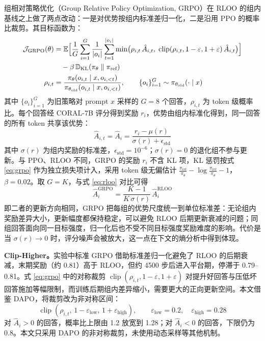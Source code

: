 \documentclass[fontset=fandol,type=master,campus=shenzhen,etitleauto=true]{hithesisbook}
\begin{document}
组相对策略优化（Group Relative Policy Optimization, GRPO）\cite{ref34}在 RLOO 的组内基线之上做了两点改动：一是对优势按组内标准差归一化，二是沿用 PPO 的概率比裁剪。其目标函数为：
\begin{equation}\label{eq:grpo}
\begin{aligned}
\mathcal{J}_{\text{GRPO}}(\theta) &= \mathbb{E} \Bigl[ \frac{1}{G}\sum_{i=1}^{G} \frac{1}{|o_i|}\sum_{t=1}^{|o_i|} \min\bigl( \rho_{i,t}\, \hat{A}_{i,t},\; \operatorname{clip}(\rho_{i,t}, 1-\varepsilon, 1+\varepsilon)\, \hat{A}_{i,t} \bigr) \Bigr] \\
&\quad - \beta\, \mathbb{D}_{\text{KL}}(\pi_\theta \parallel \pi_{\text{ref}}) \\
\rho_{i,t} &= \frac{\pi_\theta(o_{i,t} \mid x, o_{i,<t})}{\pi_{\theta_{\text{old}}}(o_{i,t} \mid x, o_{i,<t})}, \qquad \{o_i\}_{i=1}^{G} \sim \pi_{\theta_{\text{old}}}(\cdot \mid x)
\end{aligned}
\end{equation}
其中 $\{o_i\}_{i=1}^{G}$ 为旧策略对 prompt $x$ 采样的 $G = 8$ 个回答，$\rho_{i,t}$ 为 token 级概率比。每个回答经 CORAL-7B 评分得到奖励 $r_i$，优势由组内标准化得到，同一回答的所有 token 共享该优势：
\begin{equation}
\hat{A}_{i,t} = \hat{A}_i = \frac{r_i - \mu(r)}{\sigma(r) + \epsilon_{\text{std}}}
\end{equation}
其中 $\sigma(r)$ 为组内奖励的标准差，$\epsilon_{\text{std}} = 10^{-6}$；$\sigma(r) = 0$ 的退化组不参与更新。与 PPO、RLOO 不同，GRPO 的奖励 $r_i$ 不含 KL 项，KL 惩罚按式 \eqref{eq:grpo} 作为独立损失项计入，采用 token 级无偏估计 $\frac{\pi_{\text{ref}}}{\pi_\theta} - \log \frac{\pi_{\text{ref}}}{\pi_\theta} - 1$\cite{ref34}，$\beta = 0.02$。取 $G = K$，与式 \eqref{eq:rloo} 对比可得
\begin{equation}\label{eq:rloo-grpo}
\hat{A}_i^{\text{GRPO}} = \frac{K - 1}{K\, \sigma(r)}\, \hat{A}_i^{\text{RLOO}}
\end{equation}
即二者的更新方向相同，GRPO 把每组的优势尺度统一到单位标准差：无论组内奖励差异大小，更新幅度都保持稳定，可以避免 RLOO 后期更新衰减的问题；同组回答面向同一目标强度，归一化后也不受不同目标强度奖励难度的影响。代价是当 $\sigma(r) \to 0$ 时，评分噪声会被放大，这一点在下文的熵分析中得到体现。

\textbf{Clip-Higher。}实验中标准 GRPO 借助标准差归一化避免了 RLOO 的后期衰减，末期奖励（约 0.81）高于 RLOO，但约 4500 步后进入平台期，停滞于 0.79--0.81。式 \eqref{eq:grpo} 中的对称裁剪 $\operatorname{clip}(\rho_{i,t}, 1-\varepsilon, 1+\varepsilon)$ 对提升好回答与压低坏回答施加等幅限制，而训练后期组内差异缩小，需要更大的正向更新空间。本文借鉴 DAPO\cite{ref35}，将裁剪改为非对称区间：
\begin{equation}\label{eq:clip-higher}
\operatorname{clip}(\rho_{i,t},\, 1 - \varepsilon_{\text{low}},\, 1 + \varepsilon_{\text{high}}), \qquad \varepsilon_{\text{low}} = 0.2, \quad \varepsilon_{\text{high}} = 0.28
\end{equation}
对 $\hat{A}_i > 0$ 的回答，概率比上限由 1.2 放宽到 1.28；对 $\hat{A}_i < 0$ 的回答，下限仍为 0.8。本文只采用 DAPO 的非对称裁剪，未使用动态采样等其他机制。
\end{document}
